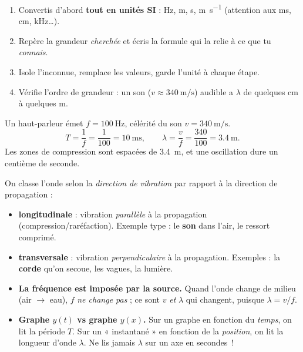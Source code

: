 \documentclass[11pt,a4paper]{article}
\begin{document}
\begin{methode}
\begin{enumerate}[leftmargin=1.6em,topsep=2pt,itemsep=1.5pt,label=\arabic*.]
  \item Convertis d'abord \textbf{tout en unités SI} : \si{\hertz}, \si{\metre},
        \si{\second}, \si{\metre\per\second} (attention aux \si{\milli\second},
        \si{\centi\metre}, \si{\kilo\hertz}\ldots).
  \item Repère la grandeur \emph{cherchée} et écris la formule qui la relie à ce que tu \emph{connais}.
  \item Isole l'inconnue, remplace les valeurs, garde l'unité à chaque étape.
  \item Vérifie l'ordre de grandeur : un son ($v\approx\SI{340}{\metre\per\second}$) audible
        a $\lambda$ de quelques \si{\centi\metre} à quelques \si{\metre}.
\end{enumerate}
\end{methode}

\begin{exemplebox}
Un haut-parleur émet $f=\SI{100}{\hertz}$, célérité du son $v=\SI{340}{\metre\per\second}$.
\[ T=\frac{1}{f}=\frac{1}{100}=\SI{10}{\milli\second},\qquad
   \lambda=\frac{v}{f}=\frac{340}{100}=\SI{3.4}{\metre}. \]
Les zones de compression sont espacées de \SI{3.4}{\metre}, et une oscillation dure
un centième de seconde.
\end{exemplebox}

\begin{cle}
On classe l'onde selon la \emph{direction de vibration} par rapport à la direction de
propagation :
\begin{itemize}[leftmargin=1.4em,topsep=2pt,itemsep=2pt]
  \item \textbf{longitudinale} : vibration \emph{parallèle} à la propagation
        (compression/raréfaction). Exemple type : le \textbf{son} dans l'air, le ressort
        comprimé.
  \item \textbf{transversale} : vibration \emph{perpendiculaire} à la propagation.
        Exemples : la \textbf{corde} qu'on secoue, les vagues, la lumière.
\end{itemize}
\end{cle}

\begin{piege}
\begin{itemize}[leftmargin=1.4em,topsep=2pt,itemsep=2pt]
  \item \textbf{La fréquence est imposée par la source.} Quand l'onde change de milieu
        (air $\to$ eau), $f$ \emph{ne change pas} ; ce sont $v$ \emph{et} $\lambda$ qui
        changent, puisque $\lambda=v/f$.
  \item \textbf{Graphe $y(t)$ vs graphe $y(x)$.} Sur un graphe en fonction du \emph{temps},
        on lit la période $T$. Sur un « instantané » en fonction de la \emph{position},
        on lit la longueur d'onde $\lambda$. Ne lis jamais $\lambda$ sur un axe en secondes~!
\end{itemize}
\end{piege}
\end{document}
